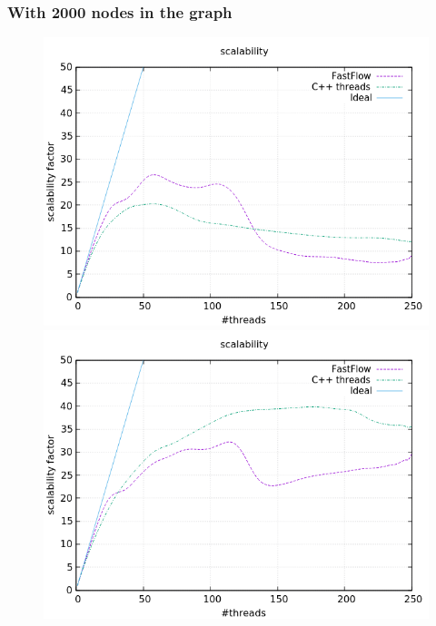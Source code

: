 \documentclass[a4paper,10pt]{article}
\begin{document}
	\subsubsection{With 2000 nodes in the graph}
		\begin{figure}[H]
			\centering
			\begin{minipage}[t]{0.32\linewidth}
				\includegraphics[width=\linewidth]{BenchMarkTSP/scalability/2000/SC2000500_zoom.png}
				\subcaption{}
			\end{minipage}%
			\begin{minipage}[t]{0.32\linewidth}
				\includegraphics[width=\linewidth]{BenchMarkTSP/scalability/2000/SC20005000_zoom.png}
				\subcaption{}
			\end{minipage}

\end{figure}
\end{document}
